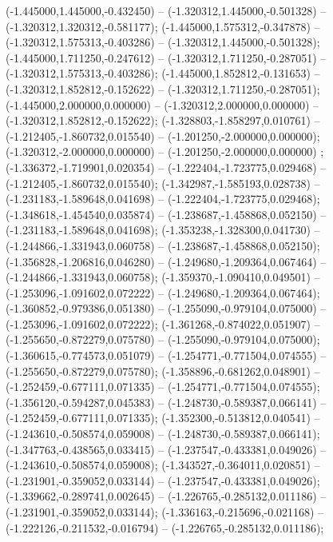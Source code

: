  (-1.445000,1.445000,-0.432450) -- (-1.320312,1.445000,-0.501328) -- (-1.320312,1.320312,-0.581177);
 (-1.445000,1.575312,-0.347878) -- (-1.320312,1.575313,-0.403286) -- (-1.320312,1.445000,-0.501328);
 (-1.445000,1.711250,-0.247612) -- (-1.320312,1.711250,-0.287051) -- (-1.320312,1.575313,-0.403286);
 (-1.445000,1.852812,-0.131653) -- (-1.320312,1.852812,-0.152622) -- (-1.320312,1.711250,-0.287051);
 (-1.445000,2.000000,0.000000) -- (-1.320312,2.000000,0.000000) -- (-1.320312,1.852812,-0.152622);
 (-1.328803,-1.858297,0.010761) -- (-1.212405,-1.860732,0.015540) -- (-1.201250,-2.000000,0.000000);
 (-1.320312,-2.000000,0.000000) -- (-1.201250,-2.000000,0.000000) ;
 (-1.336372,-1.719901,0.020354) -- (-1.222404,-1.723775,0.029468) -- (-1.212405,-1.860732,0.015540);
 (-1.342987,-1.585193,0.028738) -- (-1.231183,-1.589648,0.041698) -- (-1.222404,-1.723775,0.029468);
 (-1.348618,-1.454540,0.035874) -- (-1.238687,-1.458868,0.052150) -- (-1.231183,-1.589648,0.041698);
 (-1.353238,-1.328300,0.041730) -- (-1.244866,-1.331943,0.060758) -- (-1.238687,-1.458868,0.052150);
 (-1.356828,-1.206816,0.046280) -- (-1.249680,-1.209364,0.067464) -- (-1.244866,-1.331943,0.060758);
 (-1.359370,-1.090410,0.049501) -- (-1.253096,-1.091602,0.072222) -- (-1.249680,-1.209364,0.067464);
 (-1.360852,-0.979386,0.051380) -- (-1.255090,-0.979104,0.075000) -- (-1.253096,-1.091602,0.072222);
 (-1.361268,-0.874022,0.051907) -- (-1.255650,-0.872279,0.075780) -- (-1.255090,-0.979104,0.075000);
 (-1.360615,-0.774573,0.051079) -- (-1.254771,-0.771504,0.074555) -- (-1.255650,-0.872279,0.075780);
 (-1.358896,-0.681262,0.048901) -- (-1.252459,-0.677111,0.071335) -- (-1.254771,-0.771504,0.074555);
 (-1.356120,-0.594287,0.045383) -- (-1.248730,-0.589387,0.066141) -- (-1.252459,-0.677111,0.071335);
 (-1.352300,-0.513812,0.040541) -- (-1.243610,-0.508574,0.059008) -- (-1.248730,-0.589387,0.066141);
 (-1.347763,-0.438565,0.033415) -- (-1.237547,-0.433381,0.049026) -- (-1.243610,-0.508574,0.059008);
 (-1.343527,-0.364011,0.020851) -- (-1.231901,-0.359052,0.033144) -- (-1.237547,-0.433381,0.049026);
 (-1.339662,-0.289741,0.002645) -- (-1.226765,-0.285132,0.011186) -- (-1.231901,-0.359052,0.033144);
 (-1.336163,-0.215696,-0.021168) -- (-1.222126,-0.211532,-0.016794) -- (-1.226765,-0.285132,0.011186);
